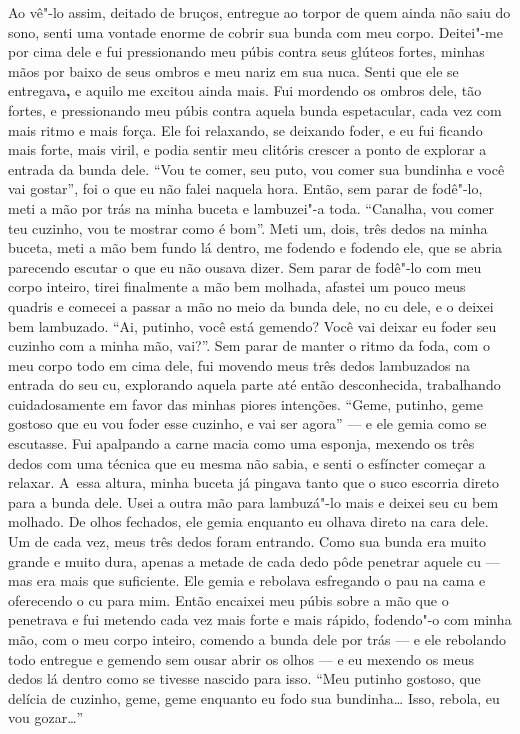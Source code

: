 Ao vê"-lo assim, deitado de bruços, entregue ao torpor de quem ainda não
saiu do sono, senti uma vontade enorme de cobrir sua bunda com meu
corpo. Deitei"-me por cima dele e fui pressionando meu púbis contra seus
glúteos fortes, minhas mãos por baixo de seus ombros e meu nariz em sua
nuca. Senti que ele se entregava\textbf{,} e aquilo me excitou ainda
mais. Fui mordendo os ombros dele, tão fortes, e pressionando meu púbis
contra aquela bunda espetacular, cada vez com mais ritmo e mais força.
Ele foi relaxando, se deixando foder, e eu fui ficando mais forte, mais
viril, e podia sentir meu clitóris crescer a ponto de explorar a entrada
da bunda dele. ``Vou te comer, seu puto, vou comer sua bundinha e você
vai gostar'', foi o que eu não falei naquela hora. Então, sem parar de
fodê"-lo, meti a mão por trás na minha buceta e lambuzei"-a toda.
``Canalha, vou comer teu cuzinho, vou te mostrar como é bom''. Meti um,
dois, três dedos na minha buceta, meti a mão bem fundo lá dentro, me
fodendo e fodendo ele, que se abria parecendo escutar o que eu não
ousava dizer. Sem parar de fodê"-lo com meu corpo inteiro, tirei
finalmente a mão bem molhada, afastei um pouco meus quadris e comecei a
passar a mão no meio da bunda dele, no cu dele, e o deixei bem
lambuzado. ``Ai, putinho, você está gemendo? Você vai deixar eu foder
seu cuzinho com a minha mão, vai?''. Sem parar de manter o ritmo da
foda, com o meu corpo todo em cima dele, fui movendo meus três dedos
lambuzados na entrada do seu cu, explorando aquela parte até então
desconhecida, trabalhando cuidadosamente em favor das minhas piores
intenções. ``Geme, putinho, geme gostoso que eu vou foder esse cuzinho,
e vai ser agora'' --- e ele gemia como se escutasse. Fui apalpando a
carne macia como uma esponja, mexendo os três dedos com uma técnica que
eu mesma não sabia, e senti o esfíncter começar a relaxar. A~essa
altura, minha buceta já pingava tanto que o suco escorria direto para a
bunda dele. Usei a outra mão para lambuzá"-lo mais e deixei seu cu bem
molhado. De olhos fechados, ele gemia enquanto eu olhava direto na cara
dele. Um de cada vez, meus três dedos foram entrando. Como sua bunda era
muito grande e muito dura, apenas a metade de cada dedo pôde penetrar
aquele cu --- mas era mais que suficiente. Ele gemia e rebolava
esfregando o pau na cama e oferecendo o cu para mim. Então encaixei meu
púbis sobre a mão que o penetrava e fui metendo cada vez mais forte e
mais rápido, fodendo"-o com minha mão, com o meu corpo inteiro, comendo a
bunda dele por trás --- e ele rebolando todo entregue e gemendo sem
ousar abrir os olhos --- e eu mexendo os meus dedos lá dentro como se
tivesse nascido para isso. ``Meu putinho gostoso, que delícia de
cuzinho, geme, geme enquanto eu fodo sua bundinha… Isso, rebola,
eu vou gozar…''

